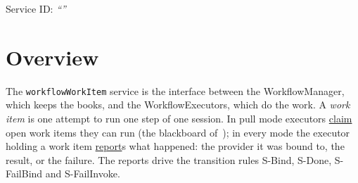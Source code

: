 \documentclass[a4paper]{arrowhead}
\newcommand{\oref}[1]{{\textcolor{ArrowheadBlue}{\hyperref[sec:operations:#1]{#1}}}}
\begin{document}
\ArrowheadSetup

\begin{center}
  \vspace*{1cm}
  \huge{\arrowtitle}

  \vspace*{0.2cm}
  \LARGE{\arrowtype}
  \vspace*{1cm}

  \Large{Service ID: \textit{``\arrowid''}}
  \vspace*{\fill}

  

  \vspace*{1cm}
  \vspace*{\fill}

  \begin{abstract}
    This document describes the \texttt{workflowWorkItem} service of the Eclipse Arrowhead workflow support systems, which lets executors claim work items and report their outcome. It is provided by the WorkflowManager system, service version 1.0.0, documentation edition 5.4.0.
  \end{abstract}

  \vspace*{1cm}
\end{center}

\newpage

\tableofcontents
\newpage

\section{Overview}
\label{sec:overview}
The \texttt{workflowWorkItem} service is the interface between the WorkflowManager, which keeps the
books, and the WorkflowExecutors, which do the work. A \emph{work item} is one attempt to run one step of one session.
In pull mode executors \oref{claim} open work items they can run (the blackboard of~\cite{derhamy2018workflow}); in
every mode the executor holding a work item \oref{report}s what happened: the provider it was bound to, the result, or
the failure. The reports drive the transition rules S-Bind, S-Done, S-FailBind and S-FailInvoke.
\end{document}
